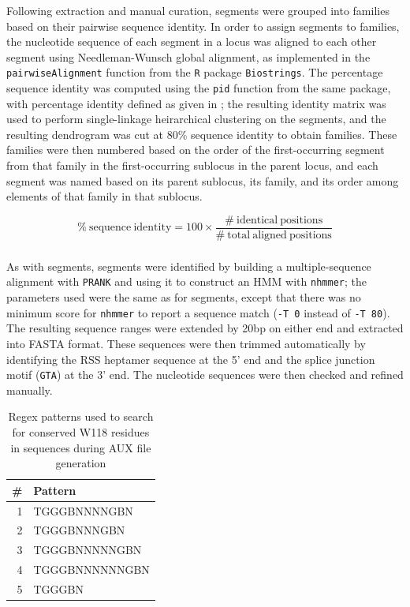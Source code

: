 Following extraction and manual curation, \vh segments were grouped into families based on their pairwise sequence identity. In order to assign segments to families, the nucleotide sequence of each \vh segment in a locus was aligned to each other segment using Needleman-Wunsch global alignment, as implemented in the \lstinline{pairwiseAlignment} function from the \lstinline{R} package \lstinline{Biostrings}. The percentage sequence identity was computed using the \lstinline{pid} function from the same package, with percentage identity defined as given in ; the resulting identity matrix was used to perform single-linkage heirarchical clustering on the \vh segments, and the resulting dendrogram was cut at 80\% sequence identity to obtain \vh families. These families were then numbered based on the order of the first-occurring \vh segment from that family in the first-occurring sublocus in the parent locus, and each \vh segment was named based on its parent sublocus, its family, and its order among elements of that family in that sublocus. %

\begin{equation}
\mathrm{\%~sequence~identity} = 100 \times \frac{\mathrm{\#~identical~positions}}{\mathrm{\#~total~aligned~positions}}
\label{eq:pid}
\end{equation}

\subsubsection{\jh}

As with \vh segments, \jh segments were identified by building a multiple-sequence alignment with \texttt{PRANK} and using it to construct an HMM with \lstinline{nhmmer}; the parameters used were the same as for \vh segments, except that there was no minimum score for \lstinline{nhmmer} to report a sequence match (\lstinline{-T 0} instead of \lstinline{-T 80}). The resulting sequence ranges were extended by 20bp on either end and extracted into FASTA format. These sequences were then trimmed automatically by identifying the RSS heptamer sequence at the 5' end and the splice junction motif (\texttt{GTA}) at the 3' end. The \jh nucleotide sequences were then checked and refined manually.

\begin{table}
\caption{Regex patterns used to search for conserved W118 residues in \jh sequences during AUX file generation}\label{tab:jh-aux-patterns}
\begin{tabular}{r>{\ttseries}l}\toprule  
\# & Pattern \\\midrule
1 & TGGGBNNNNGBN\\
2 & TGGGBNNNGBN\\
3 & TGGGBNNNNNGBN\\
4 & TGGGBNNNNNNGBN\\
5 & TGGGBN\\\bottomrule
\end{tabular}
\end{table}

